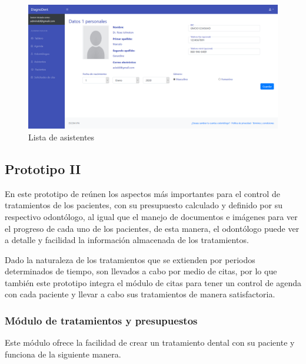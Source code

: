 \begin{figure}[H]
\centering
\includegraphics[width=17cm,keepaspectratio]{pictures/adminodo/asistentes/editar-asis.png}
\caption{Lista de asistentes}
\end{figure}






\newpage
\subsection{Prototipo II}
En este prototipo de reúnen los aspectos más importantes para el control de tratamientos de los pacientes, con su presupuesto calculado y definido por su respectivo odontólogo, al igual que el manejo de documentos e imágenes para ver el progreso de cada uno de los pacientes, de esta manera, el odontólogo puede ver a detalle y facilidad la información almacenada de los tratamientos.

\vspace{1em}

Dado la naturaleza de los tratamientos que se extienden por periodos determinados de tiempo, son llevados a cabo por medio de citas, por lo que también este prototipo integra el módulo de citas para tener un control de agenda con cada paciente y llevar a cabo sus tratamientos de manera satisfactoria.

\subsubsection{Módulo de tratamientos y presupuestos}

Este módulo ofrece la facilidad de crear un tratamiento dental con su paciente y funciona de la siguiente manera.

\vspace{1em}

